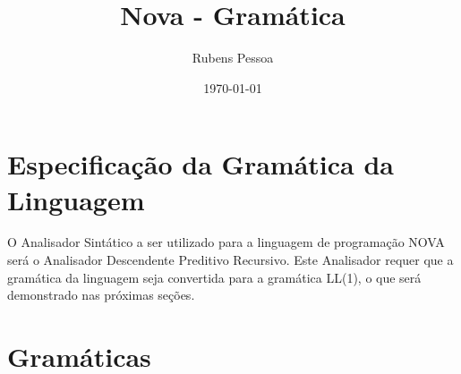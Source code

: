 \documentclass[a4paper, 12pt, article]{memoir}
\title{Nova - Gramática}
\author{Rubens Pessoa}
\date{\today}
\begin{document}
	
	

\frontmatter
\begin{titlingpage}
  \maketitle
\end{titlingpage}

\tableofcontents

\mainmatter

\section{Especificação da Gramática da Linguagem}
\label{sec:intro}
O Analisador Sintático a ser utilizado para a linguagem de programação NOVA será o Analisador Descendente Preditivo Recursivo. Este Analisador requer que a gramática da linguagem seja convertida para a gramática LL(1), o que será demonstrado nas próximas seções.

\newpage

\section{Gramáticas}
\end{document}

